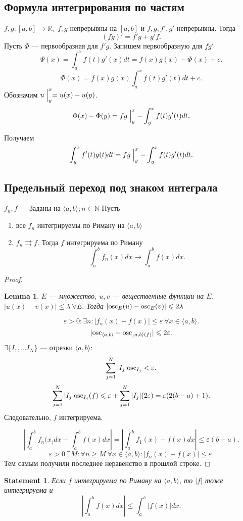 \documentclass[11pt]{book}
\newcommand{\N}{\mathbb{N}}
\newcommand{\R}{\mathbb{R}}
\newcommand{\osc}{{\mathop{\text{\rm osc}}}}
\renewcommand{\le}{\leqslant}
\renewcommand{\ge}{\geqslant}
\theoremstyle{definition}
\theoremstyle{plain}
\theoremstyle{plain}
\newtheorem*{lm}{Lemma}
\newtheorem*{st}{Statement}
\theoremstyle{definition}
\theoremstyle{remark}
\begin{document}
\subsection{Формула интегрирования по частям}
$ f, g : [a, b] \to  \R, $ $ f, g$   непрерывны на $ [a, b]$ и $ f, g, f', g'$   непрерывны.
Тогда \[
    (fg)' = f' g+g'f
.\]
Пусть $ \Phi$ --- первообразная для $ f' g$.
Запишем первообразную для $ fg'$
\[
    \Psi (x) = \int_a^{x} f(t) g'(x) dt = f(x) g(x) - \Phi (x) + c
.\]
\[
    \Phi (x) = f(x) g(x) \int_a^{x} f(t) g'(t) dt + c
.\]
Обозначим $ u \Bigm|_y^{x} = u(x) - u(y)$.
\[
    \Phi (x) - \Phi(y) = fg \Bigm|_y^{x} - \int_y^{x} f(t)g'(t)dt
.\]

Получаем
\[
    \int_y^{x} f'(t) g(t) dt = fg \Bigm|_y^{x} - \int_y^{x} f(t) g'(t) dt
.\]
\subsection{Предельный переход под знаком интеграла}
\begin{thm}
    $ f_n, f$ --- Заданы на $ \langle a, b \rangle; n \in \N$
    Пусть
    \begin{enumerate}
	\item все $ f_n$ интегрируемы по Риману на $ \langle a, b \rangle$
	\item $ f_n \rightrightarrows f$. Тогда  $ f$ интегрируема по Риману
	    \[
		\int_a^{b}f_n(x) dx \to \int_a^{b}f(x) dx
	    .\]
    \end{enumerate}
\end{thm}
\begin{proof}
    \begin{lm}
	$ E$ --- множество, $ u, v $ --- вещественные функции на $ E$. $ |u(x) - v(x) | \le  \lambda ~ \forall  E.$
	Тогда $ |\osc_E(u) - \osc_E(v) | \le  2 \lambda$
    \end{lm}
    \[
	\varepsilon  >0: \exists  n: |f_n(x) - f(x)| \le \varepsilon ~ \forall x \in  \langle a, b \rangle
    .\]
    \[
	|\osc_{\langle a, b \rangle} - \osc_{_\langle a, b \rangle(f)}| \le 2 \varepsilon
    .\]
    $\exists  \{I_1, \ldots I_N \} $ --- отрезки $ \langle  a, b \rangle$:
    \[
	\sum_{j=1}^{N }|I_j| \osc_{I_j} < \varepsilon
    .\]
    \[
	\sum_{j=1}^{N} |I_j| \osc_{I_j}(f)  \le  \varepsilon +\sum_{j=1}^{N} |I_j| (2 \varepsilon ) = \varepsilon (2 (b-a) + 1)
    .\]
    Следовательно, $ f$   интегрируема.

    \[
	\left|\int_a^{b} f_n(x_) dx - \int _a^{b}f(x) dx \right|= \left|\int_a^{b} f_1(x) - f(x) dx\right| \le  \varepsilon (b-a)
    .\]
    \[
	\varepsilon  >0  ~ \exists M : \forall n \ge M ~ \forall  x \in  \langle a, b \rangle: |f_n(x) - f(x) | \le  \varepsilon
    .\]
    Тем самым получили последнее неравенство в прошлой строке.
\end{proof}
\begin{st}
    Если $ f$ интегрируема по Риману на $ \langle  a,b \rangle$, то $ |f|$ тоже интегрируема и \[
	\left |\int_a ^{b} f(x) dx\right| \le  \int_a^{b} |f(x) |dx
    .\]
\end{st}
\end{document}
